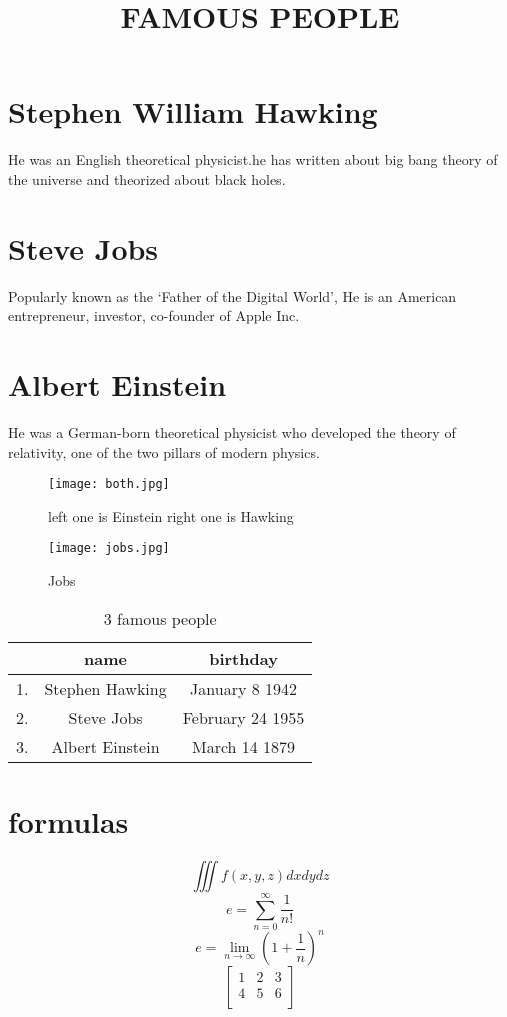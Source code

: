 \documentclass[12pt]{article}
\begin{document}
\title{FAMOUS PEOPLE}
\maketitle

\section{Stephen William Hawking} 
He was an English theoretical physicist.he has written about big bang theory of the universe and theorized about black holes.

\section{Steve Jobs}
Popularly known as the ‘Father of the Digital World’, He is an American entrepreneur, investor, co-founder of Apple Inc. 
\section{Albert Einstein} He was a German-born theoretical physicist who developed the theory of relativity, one of the two pillars of modern physics.
\begin{figure}
\texttt{[image: both.jpg]}
\caption{left one is Einstein right one is Hawking}
\end{figure}
\begin{figure}
\texttt{[image: jobs.jpg]}
\caption{Jobs}
\end{figure}



\begin{table}[h!]
  \begin{center}
    \caption{3 famous people}
    \label{tab:table1}
    \begin{tabular}{|c|c|c|} 
    \hline
      \textbf{} & \textbf{name} & \textbf{birthday}\\
    
      \hline
      1. & Stephen Hawking & January 8 1942 \\
      \cline{1-3}
      2. & Steve Jobs & February 24 1955\\
      \cline{1-3}
      3. & Albert Einstein & March 14 1879\\
      \hline
    \end{tabular}
  \end{center}
\end{table}
\section{formulas}
$$\iiint f(x,y,z)dxdydz$$
$$e=\sum_{n=0}^{\infty}\frac{1}{n!}$$
$$ e=\lim_{n\to\infty}\left(1+\frac{1}{n}\right)^n$$
$$\begin{bmatrix}
1&2&3\\
4&5&6\\
\end{bmatrix}$$
\end{document}
